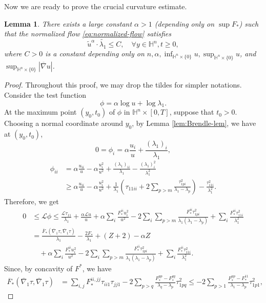 \documentclass[10pt,a4paper]{amsart}
\newtheorem{lemma}[theorem]{Lemma}
\newcommand{\abs}[1]{\left\lvert{#1}\right\rvert}
\renewcommand{\H}{{\mathbb{H}}}
\newcommand{\bnabla}{\overline{\nabla}}
\numberwithin{equation}{section}
\begin{document}
Now we are ready to prove the crucial curvature estimate.
\begin{lemma}\label{lem:estimate-on-eigenvalues}
    There exists a large constant \(\alpha > 1\) (depending only on \(\sup F_*\)) such that the normalized flow \eqref{eq:normalized-flow} satisfies
    \[ \tilde{u}^\alpha \cdot \tilde{\lambda_1} \leq C, \quad  \forall y\in \H^n, t\geq 0, \]
    where \(C>0\) is a constant depending only on \(n,\alpha, \inf_{\H^n\times\{0\}}u, \sup_{\H^n\times\{0\}}u\), and \( \sup_{\H^n\times\{0\}}\abs{\bnabla u}\).
\end{lemma} 
\begin{proof} 
    Throughout this proof, we may drop the tildes for simpler notations. Consider the test function \[ \phi = \alpha \log u + \log \lambda_1. \] 
    At the maximum point \((y_0,t_0)\) of \(\phi\) in \(\H^n \times [0,T]\), suppose that \(t_0 > 0\). Choosing a normal coordinate around \(y_0\), by Lemma \ref{lem:Brendle-lem}, we have at \((y_0,t_0)\),
    \[ 0 = \phi_i = \alpha\frac{u_i}{u} + \frac{(\lambda_1)_i}{\lambda_1},  \]
    \[ \begin{aligned}
        \phi_{ii} &= \alpha\frac{u_{ii}}{u} - \alpha\frac{u_i^2}{u^2} + \frac{(\lambda_1)_{ii}}{\lambda_1} - \frac{(\lambda_1)_i^2}{\lambda_1^2} \\
        &\geq \alpha\frac{u_{ii}}{u} - \alpha\frac{u_i^2}{u^2} + \frac{1}{\lambda_1}\left( \tau_{11ii} + 2\sum_{p>m}\frac{\tau_{1pi}^2}{\lambda_1 - \lambda_p} \right) - \frac{\tau_{11i}^2}{\lambda_1^2}.
    \end{aligned} \]
    Therefore, we get 
    \[ \begin{aligned}
            0 &\leq \mathscr{L}\phi \leq \frac{\mathscr{L}\tau_{11}}{\lambda_1} + \frac{\alpha\mathscr{L}u}{u} + \alpha\sum_i \frac{F_*^{ii}u_i^2}{u^2} - 2\sum_i \sum_{p>m}\frac{F_*^{ii}\tau_{1pi}^2}{\lambda_1(\lambda_1 - \lambda_p)} + \sum_i \frac{F_*^{ii}\tau_{11i}^2}{\lambda_1^2} \\
            &= \frac{\ddot{F_*}(\bnabla_1 \tau, \bnabla_1 \tau)}{\lambda_1} - \frac{2F_*}{\lambda_1} + (Z+2) - \alpha Z  \\
            &\quad + \alpha \sum_i \frac{F_*^{ii}u_i^2}{u^2} - 2\sum_i\sum_{p>m}\frac{F_*^{ii}\tau_{1pi}^2}{\lambda_1(\lambda_1 - \lambda_p)} + \sum_i \frac{F_*^{ii}\tau_{11i}^2}{\lambda_1^2}. 
    \end{aligned} \]
    Since, by concavity of $F^*$, we have  
    \[ \begin{aligned}
        \ddot{F_*}(\bnabla_1 \tau, \bnabla_1 \tau) &= \sum_{i,j}{F_*^{ii,jj}\tau_{ii1}\tau_{jj1}} - 2\sum_{p>q}\frac{F_*^{pp} - F_*^{qq}}{\lambda_q - \lambda_p}\tau_{1pq}^2 \leq  - 2\sum_{p>1}\frac{F_*^{pp} - F_*^{11}}{\lambda_1 - \lambda_p}\tau_{1p1}^2 ,

\end{aligned}\]
\end{proof}
\end{document}
